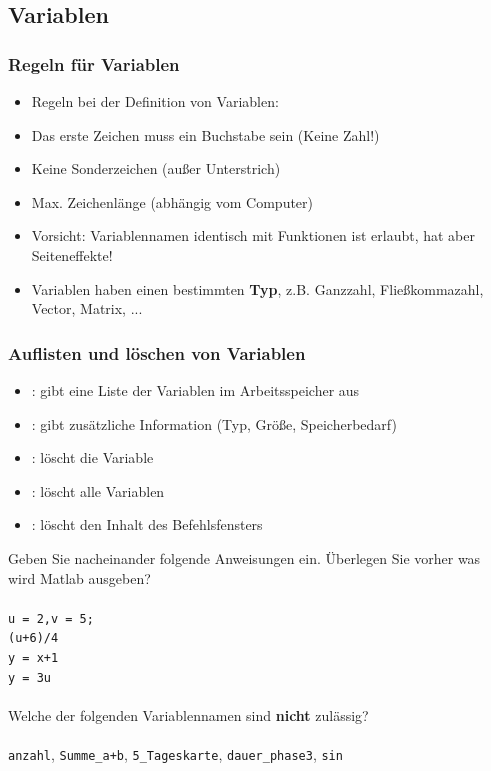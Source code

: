     \subsection{Variablen}
    \begin{frame}
      \frametitle{Regeln für Variablen}
      \begin{itemize}
        \item Regeln bei der Definition von Variablen:
        \item Das erste Zeichen muss ein Buchstabe sein (Keine Zahl!)
        \item Keine Sonderzeichen (außer Unterstrich)
        \item Max. Zeichenlänge (abhängig vom Computer)
        \item \alert{Vorsicht:} Variablennamen identisch mit Funktionen ist erlaubt, hat aber Seiteneffekte!
        \item Variablen haben einen bestimmten \textbf{Typ}, z.B. Ganzzahl, Fließkommazahl, Vector, Matrix, ...
      \end{itemize}
    \end{frame}

    \begin{frame}
      \frametitle{Auflisten und löschen von Variablen}
      \begin{itemize}
        \item {}: gibt eine Liste der Variablen im Arbeitsspeicher aus
        \item {}: gibt zusätzliche Information (Typ, Größe, Speicherbedarf)
        \item {}: löscht die Variable
        \item {}: löscht alle Variablen
        \item {}: löscht den Inhalt des Befehlsfensters
      \end{itemize}
    \end{frame}

    \secMexercise
    \begin{frame}
      \frameMexercise
      \begin{exercise}
          Geben Sie nacheinander folgende Anweisungen ein. Überlegen Sie vorher was wird Matlab ausgeben? \\ \\
          \texttt{u = 2,v = 5;} \keys{\return}\\
          \texttt{(u+6)/4} \keys{\return}\\
          \texttt{y = x+1} \keys{\return}\\
          \texttt{y = 3u} \keys{\return}\\ \\
          Welche der folgenden Variablennamen sind \textbf{nicht} zulässig? \\ \\
          \texttt{anzahl}, \texttt{Summe\_a+b}, \texttt{5\_Tageskarte}, \texttt{dauer\_phase3}, \texttt{sin}
      \end{exercise}
  \end{frame}

